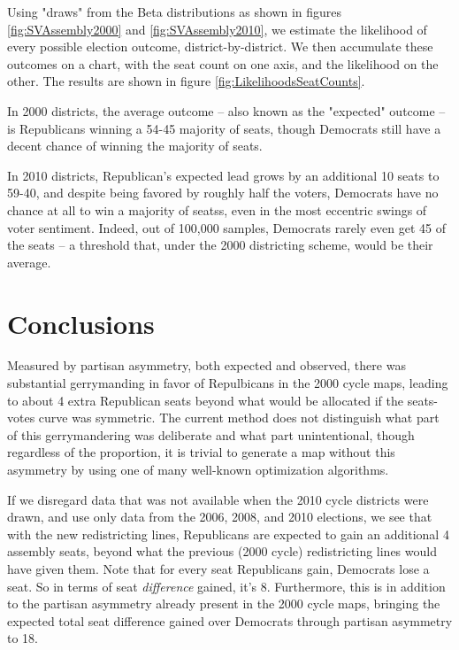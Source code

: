\documentclass[preprint,12pt]{article}
\begin{document}
Using "draws" from the Beta distributions as shown in figures \ref{fig:SVAssembly2000} and \ref{fig:SVAssembly2010}, we estimate the likelihood of every possible election outcome, district-by-district.
We then accumulate these outcomes on a chart, with the seat count on one axis, and the likelihood on the other.  The results are shown in figure \ref{fig:LikelihoodsSeatCounts}.

In 2000 districts, the average outcome -- also known as the "expected" outcome -- is Republicans winning a 54-45 majority of seats, though Democrats still have a decent chance of winning the majority of seats. 

In 2010 districts, Republican's expected lead grows by an additional 10 seats to 59-40, and despite being favored by roughly half the voters, Democrats have no chance at all to win a majority of seatss,  even in the most eccentric swings of voter sentiment.
Indeed, out of 100,000 samples, Democrats rarely even get 45 of the seats -- a threshold that, under the 2000 districting scheme, would be their average.

\section{Conclusions}

Measured by partisan asymmetry, both expected and observed, there was substantial gerrymanding in favor of Repulbicans in the 2000 cycle maps, leading to about 4 extra Republican seats beyond what would be allocated if the seats-votes curve was symmetric.
The current method does not distinguish what part of this gerrymandering was deliberate and what part unintentional, though regardless of the proportion, it is trivial to generate a map without this asymmetry by using one of many well-known optimization algorithms.

If we disregard data that was not available when the 2010 cycle districts were drawn, and use only data from the 2006, 2008, and 2010 elections, we see that with the new redistricting lines, Republicans are expected to gain an additional 4 assembly seats, beyond what the previous (2000 cycle) redistricting lines would have given them.
Note that for every seat Republicans gain, Democrats lose a seat.  So in terms of seat \emph{difference} gained, it's 8.
Furthermore, this is in addition to the partisan asymmetry already present in the 2000 cycle maps, bringing the expected total seat difference gained over Democrats through partisan asymmetry to 18.
\end{document}
